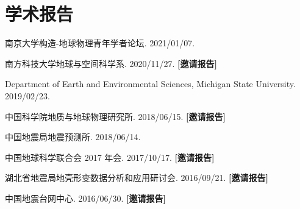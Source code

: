 \section{学术报告}

\newcommand{\Invited}{\textbf{[邀请报告]}}

\begin{etaremune}
\item
	南京大学构造-地球物理青年学者论坛.
	2021/01/07.
\item
	南方科技大学地球与空间科学系.
	2020/11/27.
	\Invited
\item
    Department of Earth and Environmental Sciences, Michigan State University.
    2019/02/23.
\item
	中国科学院地质与地球物理研究所.
	2018/06/15.
	\Invited
\item
	中国地震局地震预测所.
	2018/06/14.
\item
	中国地球科学联合会 2017 年会.
	2017/10/17.
	\Invited
\item
	湖北省地震局地壳形变数据分析和应用研讨会.
	2016/09/21.
	\Invited
\item
	中国地震台网中心.
	2016/06/30.
	\Invited
\end{etaremune}
